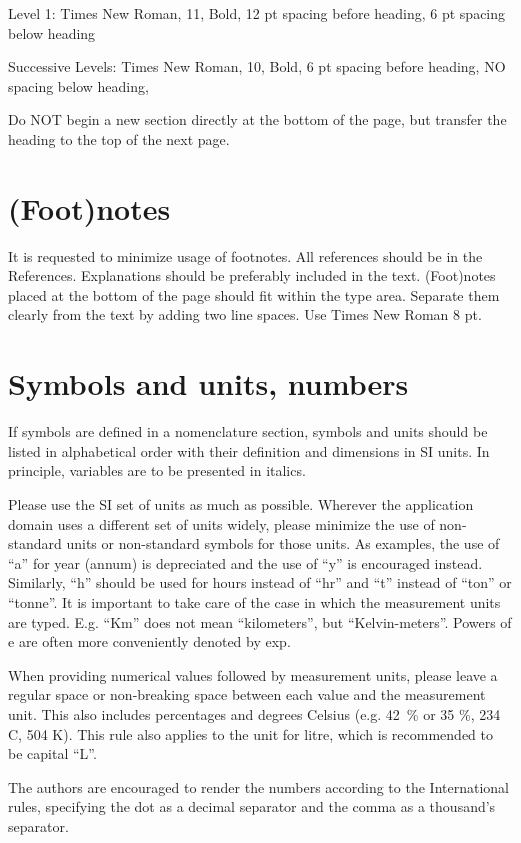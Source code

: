 \documentclass[twocolumn, 10pt]{article}
\begin{document}
Level 1: Times New Roman, 11, Bold, 12 pt spacing before heading, 6 pt spacing below heading

Successive Levels: Times New Roman, 10, Bold, 6 pt spacing before heading, NO spacing below heading, 

Do NOT begin a new section directly at the bottom of the page, but transfer the heading to the top of the next page.

\section{(Foot)notes}

It is requested to minimize usage of footnotes. All references should be in the References. Explanations should be preferably included in the text. (Foot)notes placed at the bottom of the page should fit within the type area. Separate them clearly from the text by adding two line spaces. Use Times New Roman 8 pt.

\section{Symbols and units, numbers }

If symbols are defined in a nomenclature section, symbols and units should be listed in alphabetical order with their definition and dimensions in SI units. In principle, variables are to be presented in italics. 

Please use the SI set of units as much as possible. Wherever the application domain uses a different set of units widely, please minimize the use of non-standard units or non-standard symbols for those units. As examples, the use of ``a'' for year (annum) is depreciated and the use of ``y'' is encouraged instead. Similarly, ``h'' should be used for hours instead of ``hr'' and ``t'' instead of ``ton'' or ``tonne''. It is important to take care of the case in which the measurement units are typed. E.g. ``Km'' does not mean ``kilometers'', but ``Kelvin-meters''. Powers of e are often more conveniently denoted by exp.

When providing numerical values followed by measurement units, please leave a regular space or non-breaking space between each value and the measurement unit. This also includes percentages and degrees Celsius (e.g. 42~{\%} or 35 {\%}, 234 \textdegree C, 504 K). This rule also applies to the unit for litre, which is recommended to be capital ``L''.

The authors are encouraged to render the numbers according to the International rules, specifying the dot as a decimal separator and the comma as a thousand's separator.
\end{document}
